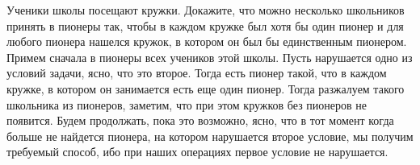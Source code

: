 \problem{}
Ученики школы посещают кружки.
Докажите, что можно несколько школьников принять в пионеры так, чтобы в каждом
кружке был хотя бы один пионер и для любого пионера нашелся кружок, в котором он
был бы единственным пионером.
\solution
Примем сначала в пионеры всех учеников этой школы.
Пусть нарушается одно из условий задачи, ясно, что это второе.
Тогда есть пионер такой, что в каждом кружке, в котором он занимается есть еще
один пионер.
Тогда разжалуем такого школьника из пионеров, заметим, что при этом кружков без
пионеров не появится.
Будем продолжать, пока это возможно, ясно, что в тот момент когда больше не
найдется пионера, на котором нарушается второе условие, мы получим требуемый
способ, ибо при наших операциях первое условие не нарушается.
\endproblem
